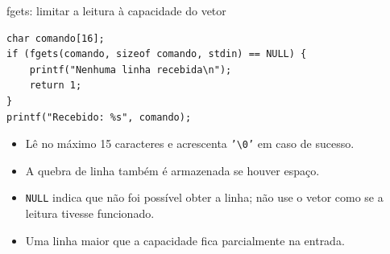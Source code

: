 \begin{frame}[fragile]{fgets: limitar a leitura à capacidade do vetor}
\begin{lstlisting}
char comando[16];
if (fgets(comando, sizeof comando, stdin) == NULL) {
    printf("Nenhuma linha recebida\n");
    return 1;
}
printf("Recebido: %s", comando);
\end{lstlisting}
\begin{itemize}
\item Lê no máximo 15 caracteres e acrescenta \texttt{'\textbackslash 0'} em caso de sucesso.
\item A quebra de linha também é armazenada se houver espaço.
\item \texttt{NULL} indica que não foi possível obter a linha; não use o vetor como se a leitura tivesse funcionado.
\item Uma linha maior que a capacidade fica parcialmente na entrada.
\end{itemize}
\end{frame}

